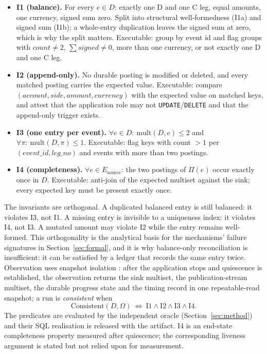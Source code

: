 \begin{itemize}[leftmargin=1.1em,itemsep=1pt]
\item \textbf{I1 (balance).} For every $e\in D$: exactly one D and one C leg, equal amounts, one
currency, signed sum zero. Split into structural well-formedness (I1a) and signed sum (I1b); a
whole-entry duplication leaves the signed sum at zero, which is why the split matters. Executable:
group by event id and flag groups with $\mathit{count}\neq2$, $\sum\mathit{signed}\neq0$, more
than one currency, or not exactly one D and one C leg.
\item \textbf{I2 (append-only).} No durable posting is modified or deleted, and every matched
posting carries the expected value. Executable: compare
$(\mathit{account},\mathit{side},\mathit{amount},\mathit{currency})$ with the expected value on
matched keys, and attest that the application role may not \texttt{UPDATE}/\texttt{DELETE} and
that the append-only trigger exists.
\item \textbf{I3 (one entry per event).} $\forall e\in D:\ \mathrm{mult}(D,e)\le 2$ and
$\forall\pi:\ \mathrm{mult}(D,\pi)\le 1$. Executable: flag keys with count $>1$ per
$(\mathit{event\_id},\mathit{leg\_no})$ and events with more than two postings.
\item \textbf{I4 (completeness).} $\forall e\in E_{\mathrm{source}}$: the two postings of
$\Pi(e)$ occur exactly once in $D$. Executable: anti-join of the expected multiset against the
sink; every expected key must be present exactly once.
\end{itemize}

The invariants are orthogonal. A duplicated balanced entry is still balanced: it violates I3, not
I1. A missing entry is invisible to a uniqueness index: it violates I4, not I3. A mutated amount
may violate I2 while the entry remains well-formed. This orthogonality is the analytical basis
for the mechanisms' failure signatures in Section~\ref{sec:formal}, and it is why balance-only
reconciliation is insufficient: it can be satisfied by a ledger that records the same entry
twice. Observation uses snapshot isolation \cite{pg-isolation,berenson1995}: after the
application stops and quiescence is established, the observation returns the sink multiset, the
publication-stream multiset, the durable progress state and the timing record in one
repeatable-read snapshot; a run is \emph{consistent} when
\begin{equation}
\label{eq:consistency}
\mathrm{Consistent}(D,\Omega)\ \Longleftrightarrow\ \text{I1}\wedge\text{I2}\wedge\text{I3}\wedge\text{I4}.
\end{equation}
The predicates are evaluated by the independent oracle (Section~\ref{sec:method}) and their SQL
realisation is released with the artifact. I4 is an end-state completeness property measured after
quiescence; the corresponding liveness argument is stated but not relied upon for measurement.

